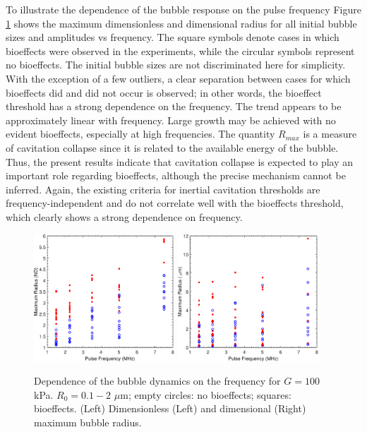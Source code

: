 To illustrate the dependence of the bubble response on the pulse
frequency Figure \ref{fig:freq} shows the maximum dimensionless and
dimensional radius for all initial bubble sizes and amplitudes vs
frequency. The square symbols denote cases in which bioeffects were
observed in the experiments, while the circular symbols represent no
bioeffects. The initial bubble sizes are not discriminated here for
simplicity. With the exception of a few outliers, a clear separation
between cases for which bioeffects did and did not occur is observed;
in other words, the bioeffect threshold has a strong dependence on the
frequency. The trend appears to be approximately linear with
frequency. Large growth may be achieved with no evident bioeffects,
especially at high frequencies. The quantity $R_{max}$ is a measure of
cavitation collapse since it is related to the available energy of the
bubble. Thus, the present results indicate that cavitation collapse is
expected to play an important role regarding bioeffects, although the
precise mechanism cannot be inferred. Again, the existing criteria for
inertial cavitation thresholds are frequency-independent and do not
correlate well with the bioeffects threshold, which clearly shows a
strong dependence on frequency.
\begin{figure}%
  \includegraphics[width=0.47\textwidth]{./figs/bubble_figs/rstarmax_f}  
  \includegraphics[width=0.47\textwidth]{./figs/bubble_figs/rmax_f}      
  \caption[Dependence of the bubble dynamics on the ultrasound frequency]{ Dependence of the bubble dynamics on the frequency for
    $G=100$ kPa. $R_0=0.1-2$ $\mu$m; empty circles: no bioeffects; squares:
    bioeffects. (Left) Dimensionless (Left) and dimensional (Right) maximum bubble radius.}
  \label{fig:freq}
\end{figure}

